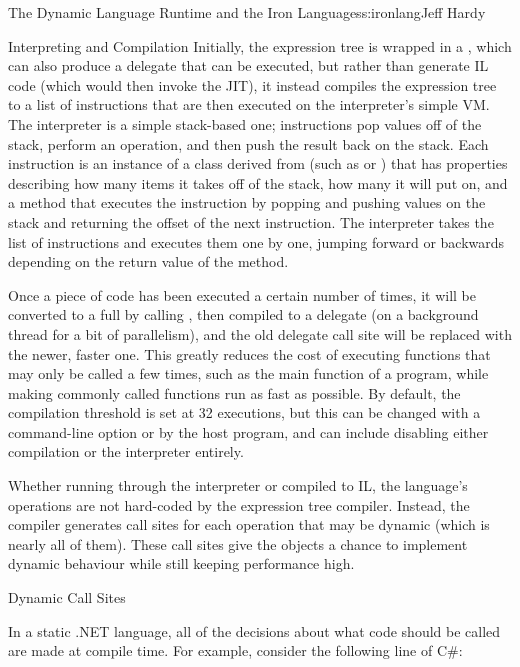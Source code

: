 \begin{aosachapter}{The Dynamic Language Runtime and the Iron Languages}{s:ironlang}{Jeff Hardy}
\begin{aosasect1}{Interpreting and Compilation}
Initially, the expression tree is wrapped in a ,
which can also produce a delegate that can be executed, but rather than
generate IL code (which would then invoke the JIT), it instead compiles the
expression tree to a list of instructions that are then executed on the
interpreter's simple VM. The interpreter is a simple stack-based one;
instructions pop values off of the stack, perform an operation, and then push
the result back on the stack. Each instruction is an instance of a class
derived from  (such as
 or ) that has properties
describing how many items it takes off of the stack, how many it will put on,
and a  method that executes the instruction by popping and pushing
values on the stack and returning the offset of the next instruction. The
interpreter takes the list of instructions and executes them one by one,
jumping forward or backwards depending on the return value of the 
method.

Once a piece of code has been executed a certain number of times, it will be
converted to a full  by calling
, then compiled to a 
delegate (on a background thread for a bit of parallelism), and the old
delegate call site will be replaced with the newer, faster one. This greatly
reduces the cost of executing functions that may only be called a few times,
such as the main function of a program, while making commonly called functions
run as fast as possible. By default, the compilation threshold is set at 32
executions, but this can be changed with a command-line option or by the host
program, and can include disabling either compilation or the interpreter 
entirely.

Whether running through the interpreter or compiled to IL, the language's
operations are not hard-coded by the expression tree compiler. Instead, the
compiler generates call sites for each operation that may be dynamic (which is
nearly all of them). These call sites give the objects a chance to implement
dynamic behaviour while still keeping performance high.

\end{aosasect1}

\begin{aosasect1}{Dynamic Call Sites}

In a static .NET language, all of the decisions about what code should be
called are made at compile time. For example, consider the following line of
C\#:


\end{aosasect1}
\end{aosachapter}
